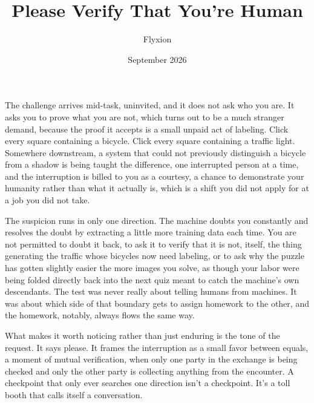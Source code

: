 \documentclass[11pt]{article}
\title{Please Verify That You're Human}
\author{Flyxion}
\date{September 2026}
\begin{document}
\maketitle

The challenge arrives mid-task, uninvited, and it does not ask who you are. It asks you to prove what you are not, which turns out to be a much stranger demand, because the proof it accepts is a small unpaid act of labeling. Click every square containing a bicycle. Click every square containing a traffic light. Somewhere downstream, a system that could not previously distinguish a bicycle from a shadow is being taught the difference, one interrupted person at a time, and the interruption is billed to you as a courtesy, a chance to demonstrate your humanity rather than what it actually is, which is a shift you did not apply for at a job you did not take.

The suspicion runs in only one direction. The machine doubts you constantly and resolves the doubt by extracting a little more training data each time. You are not permitted to doubt it back, to ask it to verify that it is not, itself, the thing generating the traffic whose bicycles now need labeling, or to ask why the puzzle has gotten slightly easier the more images you solve, as though your labor were being folded directly back into the next quiz meant to catch the machine's own descendants. The test was never really about telling humans from machines. It was about which side of that boundary gets to assign homework to the other, and the homework, notably, always flows the same way.

What makes it worth noticing rather than just enduring is the tone of the request. It says please. It frames the interruption as a small favor between equals, a moment of mutual verification, when only one party in the exchange is being checked and only the other party is collecting anything from the encounter. A checkpoint that only ever searches one direction isn't a checkpoint. It's a toll booth that calls itself a conversation.
\end{document}
